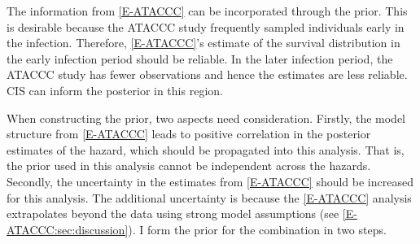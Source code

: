 \documentclass[12pt, letterpaper]{article} %
\begin{document}
The information from \cref{E-ATACCC} can be incorporated through the prior.
This is desirable because the ATACCC study frequently sampled individuals early in the infection.
Therefore, \cref{E-ATACCC}'s estimate of the survival distribution in the early infection period should be reliable.
In the later infection period, the ATACCC study has fewer observations and hence the estimates are less reliable.
CIS can inform the posterior in this region.

When constructing the prior, two aspects need consideration.
Firstly, the model structure from \cref{E-ATACCC} leads to positive correlation in the posterior estimates of the hazard, which should be propagated into this analysis.
That is, the prior used in this analysis cannot be independent across the hazards.
Secondly, the uncertainty in the estimates from \cref{E-ATACCC} should be increased for this analysis.
The additional uncertainty is because the \cref{E-ATACCC} analysis extrapolates beyond the data using strong model assumptions (see \cref{E-ATACCC:sec:discussion}).
I form the prior for the combination in two steps.
\end{document}
